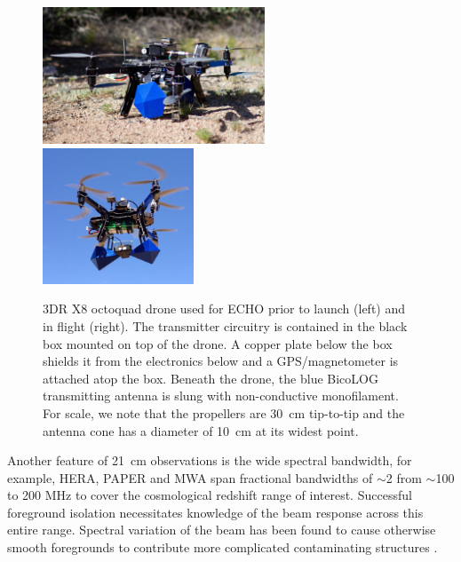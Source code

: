 \documentclass[preprint2,numberedappendix,tighten,twocolappendix]{aastex6}
\begin{document}
\begin{figure}[hbt]
\centering
\includegraphics[width=0.59\textwidth]{figures/drone2.png}
\includegraphics[width=0.4\textwidth]{figures/drone.png}
\caption{3DR X8 octoquad drone used for ECHO prior to launch (left) and in flight (right).  The transmitter circuitry is contained in the black box mounted on top of the drone.  A copper plate below the box shields it from the electronics below and a GPS/magnetometer is attached atop the box. Beneath the drone, the blue BicoLOG transmitting antenna is slung with non-conductive monofilament. For scale, we note that the propellers are 30~cm tip-to-tip and the antenna cone has a diameter of 10~cm at its widest point.}
\label{fig:drone}
\end{figure}

Another feature of 21~cm observations is the wide spectral bandwidth, for example, HERA, PAPER and MWA span fractional bandwidths of $\sim$2 from $\sim$100 to 200 MHz to cover the cosmological redshift range of interest. Successful foreground isolation necessitates knowledge of the beam response across this entire range.  Spectral variation of the beam has been found to cause otherwise smooth foregrounds to contribute more complicated contaminating structures \citep{2016:ThyagarajanBeamChromaticity,2016:EwallWiceHERAdisharXiv}. 
\end{document}
